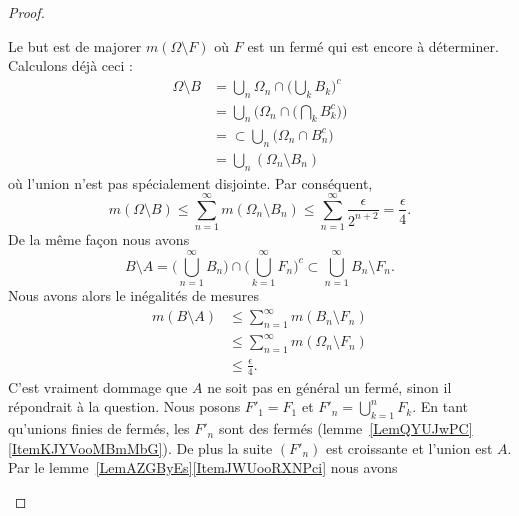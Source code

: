 \begin{proof}
\begin{subproof}
\begin{subproof}
                Le but est de majorer \( m(\Omega\setminus F)\) où \( F\) est un fermé qui est encore à déterminer. Calculons déjà ceci :
                \begin{subequations}
                    \begin{align}
                \Omega\setminus B & =\bigcup_n\Omega_n\cap\big( \bigcup_kB_k \big)^c                \\
                                  & =\bigcup_n\Big( \Omega_n\cap\big( \bigcap_kB_k^c \big) \Big)    \\
                                  & =\subset\bigcup_n\big( \Omega_n\cap B_n^c \big)                 \\
                                  & =\bigcup_n(\Omega_n\setminus B_n)
                    \end{align}
                \end{subequations}
                où l'union n'est pas spécialement disjointe. Par conséquent,
                \begin{equation}
                    m(\Omega\setminus B)\leq \sum_{n=1}^{\infty}m(\Omega_n\setminus B_n)\leq \sum_{n=1}^{\infty}\frac{ \epsilon }{ 2^{n+2} }=\frac{ \epsilon }{ 4 }.
                \end{equation}
                De la même façon nous avons
                \begin{equation}
                    B\setminus A=\big( \bigcup_{n=1}^{\infty}B_n \big)\cap\big( \bigcup_{k=1}^{\infty}F_n \big)^c\subset \bigcup_{n=1}^{\infty}B_n\setminus F_n.
                \end{equation}
                Nous avons alors le inégalités de mesures
                \begin{subequations}
                    \begin{align}
                m(B\setminus A) & \leq \sum_{n=1}^{\infty}m(B_n\setminus F_n)             \\
                                & \leq \sum_{n=1}^{\infty}m(\Omega_n\setminus F_n)        \\
                                & \leq \frac{ \epsilon }{ 4 }.
                    \end{align}
                \end{subequations}
                C'est vraiment dommage que \( A\) ne soit pas en général un fermé, sinon il répondrait à la question. Nous posons \( F'_1=F_1\) et \( F'_n=\bigcup_{k=1}^nF_k\). En tant qu'unions finies de fermés, les \( F'_n\) sont des fermés (lemme~\ref{LemQYUJwPC}\ref{ItemKJYVooMBmMbG}). De plus la suite \( (F'_n)\)  est croissante et l'union est \( A\). Par le lemme~\ref{LemAZGByEs}\ref{ItemJWUooRXNPci} nous avons

\end{subproof}
\end{subproof}
\end{proof}
